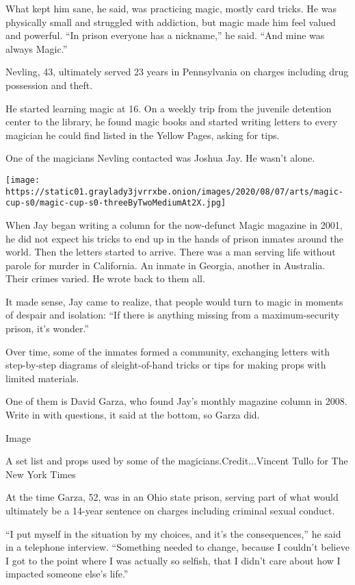 What kept him sane, he said, was practicing magic, mostly card tricks.
He was physically small and struggled with addiction, but magic made him
feel valued and powerful. ``In prison everyone has a nickname,'' he
said. ``And mine was always Magic.''

Nevling, 43, ultimately served 23 years in Pennsylvania on charges
including drug possession and theft.

He started learning magic at 16. On a weekly trip from the juvenile
detention center to the library, he found magic books and started
writing letters to every magician he could find listed in the Yellow
Pages, asking for tips.

One of the magicians Nevling contacted was Joshua Jay. He wasn't alone.

\texttt{[image: https://static01.graylady3jvrrxbe.onion/images/2020/08/07/arts/magic-cup-s0/magic-cup-s0-threeByTwoMediumAt2X.jpg]}

When Jay began writing a column for the now-defunct Magic magazine in
2001, he did not expect his tricks to end up in the hands of prison
inmates around the world. Then the letters started to arrive. There was
a man serving life without parole for murder in California. An inmate in
Georgia, another in Australia. Their crimes varied. He wrote back to
them all.

It made sense, Jay came to realize, that people would turn to magic in
moments of despair and isolation: ``If there is anything missing from a
maximum-security prison, it's wonder.''

Over time, some of the inmates formed a community, exchanging letters
with step-by-step diagrams of sleight-of-hand tricks or tips for making
props with limited materials.

One of them is David Garza, who found Jay's monthly magazine column in
2008. Write in with questions, it said at the bottom, so Garza did.

Image

A set list and props used by some of the magicians.Credit...Vincent
Tullo for The New York Times

At the time Garza, 52, was in an Ohio state prison, serving part of what
would ultimately be a 14-year sentence on charges including criminal
sexual conduct.

``I put myself in the situation by my choices, and it's the
consequences,'' he said in a telephone interview. ``Something needed to
change, because I couldn't believe I got to the point where I was
actually so selfish, that I didn't care about how I impacted someone
else's life.''

